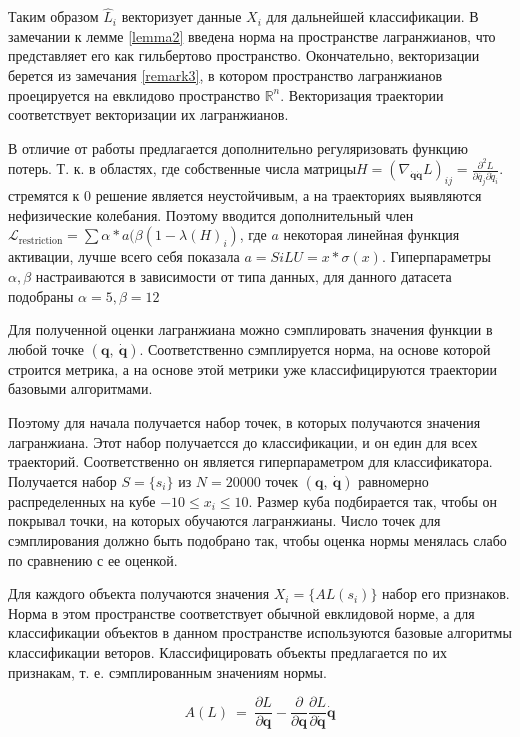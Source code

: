 \documentclass[a4paper, 12pt]{article}
\renewcommand{\le}{\ensuremath{\leqslant}}
\begin{document}
Таким образом $\hat{L}_i$ векторизует данные $X_i$ для дальнейшей классификации. В замечании к лемме \ref{lemma2} введена норма на пространстве лагранжианов, что представляет его как гильбертово пространство. Окончательно, векторизации берется из замечания \ref{remark3}, в котором пространство лагранжианов проецируется на евклидово пространство $\mathbb{R}^n$. Векторизация траектории соответствует векторизации их лагранжианов.

В отличие от работы \cite{article} предлагается дополнительно регуляризовать функцию потерь. Т. к. в областях, где собственные числа матрицы$H = \left(\nabla_{\dot{\mathbf{q}}\dot{\mathbf{q}}} L\right)_{i j}=\frac{\partial^{2} L}{\partial \dot{q_{j}} \partial \dot{q}_{i}}.$ стремятся к 0 решение является неустойчивым, а на траекториях выявляются нефизические колебания. Поэтому вводится дополнительный член $\mathcal{L}_\text{restriction} =  \sum \alpha * a(\beta(1 - \lambda(H)_i)$, где $a$ некоторая линейная функция активации, лучше всего себя показала $a = SiLU = x*\sigma(x)$. Гиперпараметры $\alpha, \beta$ настраиваются в зависимости от типа данных, для данного датасета подобраны $\alpha = 5, \beta = 12$

Для полученной оценки лагранжиана можно сэмплировать значения функции в любой точке $(\mathbf{q},\ \mathbf{\dot{q}})$. Соответственно сэмплируется норма, на основе которой строится метрика, а на основе этой метрики уже классифицируются траектории базовыми алгоритмами.

Поэтому для начала получается набор точек, в которых получаются значения лагранжиана. Этот набор получаетсся до классификации, и он един для всех траекторий. Соответственно он является гиперпараметром для классификатора. Получается набор $S = \{s_i\}$ из $N = 20000$ точек $(\mathbf{q},\ \mathbf{\dot{q}})$ равномерно распределенных на кубе $-10 \le {x_i} \le 10$. Размер куба подбирается так, чтобы он покрывал точки, на которых обучаются лагранжианы. Число точек для сэмплирования должно быть подобрано так, чтобы оценка нормы менялась слабо по сравнению с ее оценкой.

Для каждого объекта получаются значения $X_i = \{AL(s_i)\}$ набор его признаков. Норма в этом пространстве соответствует обычной евклидовой норме, а для классификации объектов в данном пространстве используются базовые алгоритмы классификации веторов. Классифицировать объекты предлагается по их признакам, т. е. сэмплированным значениям нормы.

\[A(L)\ =\ \frac{\partial L}{\partial \mathbf{q}}-\frac{\partial}{\partial \mathbf{q}} \frac{\partial L}{\partial \dot{\mathbf{q}}} \dot{\mathbf{q}}\]
\end{document}
